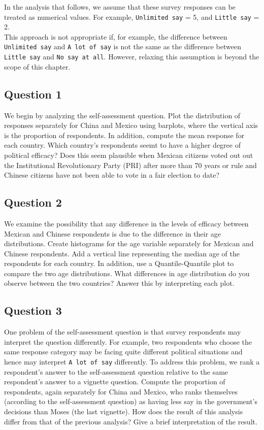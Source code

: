 \documentclass[]{article}
\begin{document}
In the analysis that follows, we assume that these survey responses can
be treated as numerical values. For example, \texttt{Unlimited say} = 5,
and \texttt{Little say} = 2.\\This approach is not appropriate if, for
example, the difference between \texttt{Unlimited say} and
\texttt{A lot of say} is not the same as the difference between
\texttt{Little say} and \texttt{No say at all}. However, relaxing this
assumption is beyond the scope of this chapter.

\subsection{Question 1}\label{question-1}

We begin by analyzing the self-assessment question. Plot the
distribution of responses separately for China and Mexico using
barplots, where the vertical axis is the proportion of respondents. In
addition, compute the mean response for each country. Which country's
respondents seemt to have a higher degree of political efficacy? Does
this seem plausible when Mexican citizens voted out out the
Institutional Revolutionary Party (PRI) after more than 70 years or rule
and Chinese citizens have not been able to vote in a fair election to
date?

\subsection{Question 2}\label{question-2}

We examine the possibility that any difference in the levels of efficacy
between Mexican and Chinese respondents is due to the difference in
their age distributions. Create histograms for the age variable
separately for Mexican and Chinese respondents. Add a vertical line
representing the median age of the respondents for each country. In
addition, use a Quantile-Quantile plot to compare the two age
distributions. What differences in age distribution do you observe
between the two countries? Answer this by interpreting each plot.

\subsection{Question 3}\label{question-3}

One problem of the self-assessment question is that survey respondents
may interpret the question differently. For example, two respondents who
choose the same response category may be facing quite different
political situations and hence may interpret \texttt{A lot of say}
differently. To address this problem, we rank a respondent's answer to
the self-assessment question relative to the same respondent's answer to
a vignette question. Compute the proportion of respondents, again
separately for China and Mexico, who ranks themselves (according to the
self-assessment question) as having less say in the government's
decisions than Moses (the last vignette). How does the result of this
analysis differ from that of the previous analysis? Give a brief
interpretation of the result.
\end{document}
